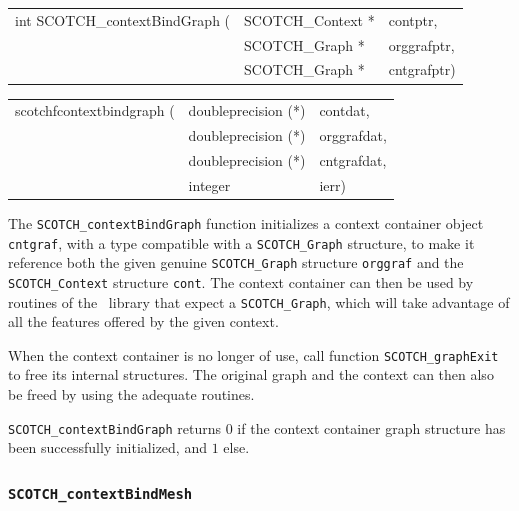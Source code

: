 \begin{itemize}
\progsyn

{\tt\begin{tabular}{l@{}ll}
int SCOTCH\_contextBindGraph ( & SCOTCH\_Context * & contptr,    \\
                               & SCOTCH\_Graph *   & orggrafptr, \\
                               & SCOTCH\_Graph *   & cntgrafptr)
\end{tabular}}

{\tt\begin{tabular}{l@{}ll}
scotchfcontextbindgraph ( & doubleprecision (*) & contdat,    \\
                          & doubleprecision (*) & orggrafdat, \\
                          & doubleprecision (*) & cntgrafdat, \\
                          & integer             & ierr)
\end{tabular}}

\progdes

The \texttt{SCOTCH\_contextBindGraph} function initializes a context
container object \texttt{cnt\lbt graf}, with a type compatible with a
\texttt{SCOTCH\_\lbt Graph} structure, to make it reference both the
given genuine \texttt{SCOTCH\_\lbt Graph} structure
\texttt{org\lbt graf} and the \texttt{SCOTCH\_\lbt Context} structure
\texttt{cont}. The context container can then be used by routines of
the \libscotch\ library that expect a \texttt{SCOTCH\_\lbt Graph},
which will take advantage of all the features offered by the given
context.

When the context container is no longer of use, call function
\texttt{SCOTCH\_\lbt graph\lbt Exit} to free its internal
structures. The original graph and the context can then also be freed
by using the adequate routines.

\progret

\texttt{SCOTCH\_contextBindGraph} returns $0$ if the context container
graph structure has been successfully initialized, and $1$ else.
\end{itemize}

\subsubsection{\texttt{SCOTCH\_contextBindMesh}}

